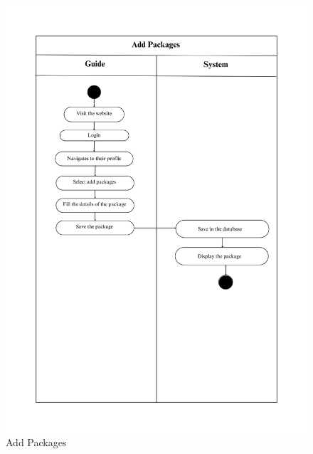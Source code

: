 \begin{figure}[h]
    \centering
    \includegraphics[width=1\textwidth]{Images/Activity Diagrams/14 Add Packages.png}
    \caption{Add Packages}
    \label{fig:activity-add-packages}
\end{figure}


